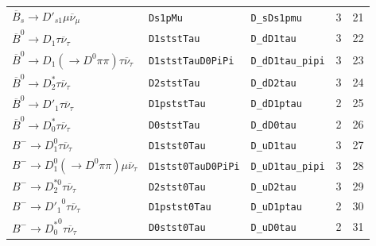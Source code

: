 \begin{table}[!htb]
\begin{tabular}{lllrr}
 $\overline{B}_s \rightarrow D'_{s1} \mu \overline{\nu}_\mu$                          & \texttt{Ds1pMu}                   & \texttt{D\_sDs1pmu}        &                     3 &               21 \\
 $\overline{B}^0 \rightarrow D_1 \tau \overline{\nu}_\tau$                            & \texttt{D1ststTau}                & \texttt{D\_dD1tau}         &                     3 &               22 \\
 $\overline{B}^0 \rightarrow D_1 (\rightarrow D^0 \pi\pi) \tau \overline{\nu}_\tau$   & \texttt{D1ststTauD0PiPi}          & \texttt{D\_dD1tau\_pipi}   &                     3 &               23 \\
 $\overline{B}^0 \rightarrow D^*_2 \tau \overline{\nu}_\tau$                          & \texttt{D2ststTau}                & \texttt{D\_dD2tau}         &                     3 &               24 \\
 $\overline{B}^0 \rightarrow D'_1 \tau \overline{\nu}_\tau$                           & \texttt{D1pststTau}               & \texttt{D\_dD1ptau}        &                     2 &               25 \\
 $\overline{B}^0 \rightarrow D^*_0 \tau \overline{\nu}_\tau$                          & \texttt{D0ststTau}                & \texttt{D\_dD0tau}         &                     2 &               26 \\
 $B^- \rightarrow D_1^0 \tau \overline{\nu}_\tau$                                     & \texttt{D1stst0Tau}               & \texttt{D\_uD1tau}         &                     3 &               27 \\
 $B^- \rightarrow D_1^0 (\rightarrow D^0 \pi\pi) \mu \overline{\nu}_\tau$             & \texttt{D1stst0TauD0PiPi}         & \texttt{D\_uD1tau\_pipi}   &                     3 &               28 \\
 $B^- \rightarrow D_2^{*0} \tau \overline{\nu}_\tau$                                  & \texttt{D2stst0Tau}               & \texttt{D\_uD2tau}         &                     3 &               29 \\
 $B^- \rightarrow {D'_1}^0 \tau \overline{\nu}_\tau$                                  & \texttt{D1pstst0Tau}              & \texttt{D\_uD1ptau}        &                     2 &               30 \\
 $B^- \rightarrow {D^*_0}^0 \tau \overline{\nu}_\tau$                                 & \texttt{D0stst0Tau}               & \texttt{D\_uD0tau}         &                     2 &               31 \\

\end{tabular}
\end{table}
